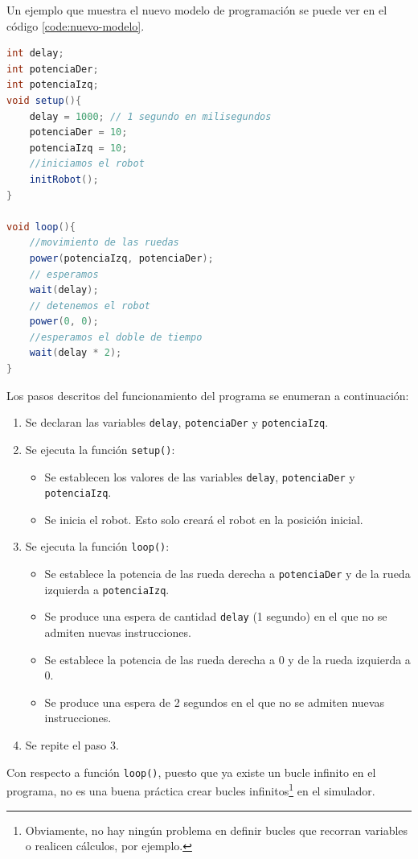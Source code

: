 Un ejemplo que muestra el nuevo modelo de programación se puede ver en el código \ref{code:nuevo-modelo}.

\begin{lstlisting}[language={Java},label={code:nuevo-modelo}, caption={Programa de ejemplo que mueve al robot con el nuevo Modelo de programación establecido para el simulador.}]
int delay;
int potenciaDer;
int potenciaIzq;
void setup(){
	delay = 1000; // 1 segundo en milisegundos
	potenciaDer = 10;
	potenciaIzq = 10;
	//iniciamos el robot
	initRobot();
}

void loop(){
	//movimiento de las ruedas
	power(potenciaIzq, potenciaDer); 
	// esperamos 
	wait(delay);
	// detenemos el robot
	power(0, 0);
	//esperamos el doble de tiempo
	wait(delay * 2);
}
\end{lstlisting}

Los pasos descritos del funcionamiento del programa se enumeran a continuación:

\begin{enumerate}
	\item Se declaran las variables \texttt{delay}, \texttt{potenciaDer} y \texttt{potenciaIzq}. 
	\item Se ejecuta la función \texttt{setup()}:
\begin{itemize}
	\item Se establecen los valores de las variables \texttt{delay}, \texttt{potenciaDer} y \texttt{potenciaIzq}. 
	\item Se inicia el robot. Esto solo creará el robot en la posición inicial. 
\end{itemize}
	\item Se ejecuta la función \texttt{loop()}:
\begin{itemize}
	\item Se establece la potencia de las rueda derecha a \texttt{potenciaDer} y de la rueda izquierda a \texttt{potenciaIzq}.
	\item Se produce una espera de cantidad \texttt{delay} (1 segundo) en el que no se admiten nuevas instrucciones.
	\item Se establece la potencia de las rueda derecha a 0 y de la rueda izquierda a 0.
	\item Se produce una espera de 2 segundos en el que no se admiten nuevas instrucciones.
\end{itemize}
	\item Se repite el paso 3.
\end{enumerate}

Con respecto a función \texttt{loop()}, puesto que ya existe un bucle infinito en el programa, no es una buena práctica crear bucles infinitos\footnote{Obviamente, no hay ningún problema en definir bucles que recorran variables o realicen cálculos, por ejemplo.} en el simulador.

